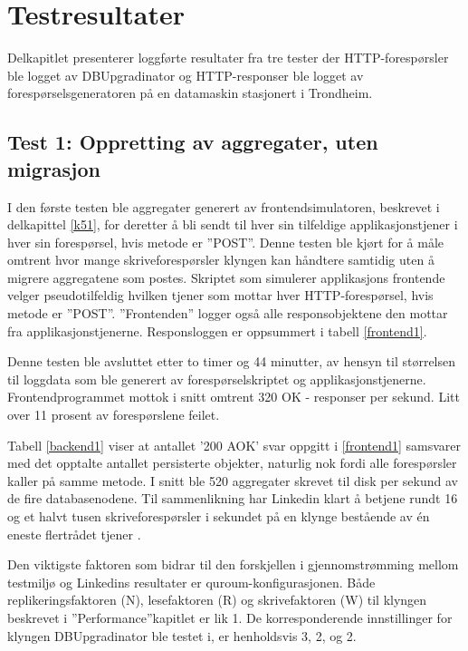 \section{Testresultater} \label{testing}

Delkapitlet presenterer loggførte resultater fra tre tester der HTTP-forespørsler ble logget av DBUpgradinator og HTTP-responser ble logget av forespørselsgeneratoren på en datamaskin stasjonert i Trondheim.

\subsection{Test 1: Oppretting av aggregater, uten migrasjon}

I den første testen ble aggregater generert av frontendsimulatoren, beskrevet i delkapittel \ref{k51}, for deretter å bli sendt til hver sin tilfeldige applikasjonstjener i hver sin forespørsel, hvis metode er ''POST''. Denne testen ble kjørt for å måle omtrent hvor mange skriveforespørsler klyngen kan håndtere samtidig uten å migrere aggregatene som postes. Skriptet som simulerer applikasjons frontende velger pseudotilfeldig hvilken tjener som mottar hver HTTP-forespørsel, hvis metode er ''POST''. ''Frontenden'' logger også alle responsobjektene den mottar fra applikasjonstjenerne. Responsloggen er oppsummert i tabell \ref{frontend1}.



Denne testen ble avsluttet etter to timer og 44 minutter, av hensyn til størrelsen til loggdata som ble generert av forespørselskriptet og applikasjonstjenerne. Frontend\-programmet mottok i snitt omtrent 320 OK - responser per sekund. Litt over 11 prosent av forespørslene feilet.



Tabell \ref{backend1} viser at antallet '200 AOK' svar oppgitt i \ref{frontend1} samsvarer med det opptalte antallet persisterte objekter, naturlig nok fordi alle forespørsler kaller på samme metode. I snitt ble 520 aggregater skrevet til disk per sekund av de fire databasenodene. Til sammenlikning har Linkedin klart å betjene rundt 16 og et halvt tusen skriveforespørsler i sekundet på en klynge bestående av én eneste flertrådet tjener \citep{kreps2009}.

Den viktigste faktoren som bidrar til den forskjellen i gjennomstrømming mellom testmiljø og Linkedins resultater er quroum-konfigurasjonen. Både replikeringsfaktoren (N), lesefaktoren (R) og skrivefaktoren (W) til klyngen beskrevet i ''Performance''\-kapitlet er lik 1. De korresponderende innstillinger for klyngen DBUpgradinator ble testet i, er henholdsvis 3, 2, og 2.

